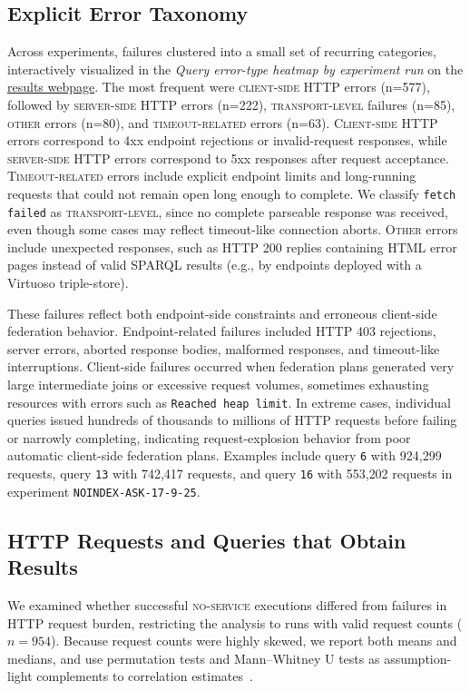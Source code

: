 \documentclass[runningheads]{llncs}
\begin{document}
\subsection{Explicit Error Taxonomy}\label{sec5.2}
Across experiments, failures clustered into a small set of recurring categories, interactively visualized in the \textit{Query error-type heatmap by experiment run} on the \href{https://ecrum19.github.io/fed-survey-results/?mode=query&query=001&queryVariant=original}{results webpage}. 
The most frequent were \textsc{client-side HTTP} errors (n=577), followed by \textsc{server-side HTTP} errors (n=222), \textsc{transport-level} failures (n=85), \textsc{other} errors (n=80), and \textsc{timeout-related} errors (n=63). 
\textsc{Client-side HTTP} errors correspond to 4xx endpoint rejections or invalid-request responses, while \textsc{server-side HTTP} errors correspond to 5xx responses after request acceptance. 
\textsc{Timeout-related} errors include explicit endpoint limits and long-running requests that could not remain open long enough to complete. 
We classify \texttt{fetch failed} as \textsc{transport-level}, since no complete parseable response was received, even though some cases may reflect timeout-like connection aborts. 
\textsc{Other} errors include unexpected responses, such as HTTP 200 replies containing HTML error pages instead of valid SPARQL results (e.g., by endpoints deployed with a Virtuoso triple-store).

These failures reflect both endpoint-side constraints and erroneous client-side federation behavior. 
Endpoint-related failures included HTTP 403 rejections, server errors, aborted response bodies, malformed responses, and timeout-like interruptions. 
Client-side failures occurred when federation plans generated very large intermediate joins or excessive request volumes, sometimes exhausting resources with errors such as \texttt{Reached heap limit}. 
In extreme cases, individual queries issued hundreds of thousands to millions of HTTP requests before failing or narrowly completing, indicating request-explosion behavior from poor automatic client-side federation plans. 
Examples include query \texttt{6} with 924{,}299 requests, query \texttt{13} with 742{,}417 requests, and query \texttt{16} with 553{,}202 requests in experiment \texttt{NOINDEX-ASK-17-9-25}.


\subsection{HTTP Requests and Queries that Obtain Results}\label{sec5.3}
We examined whether successful \textsc{no-service} executions differed from failures in HTTP request burden, restricting the analysis to runs with valid request counts ($n=954$). 
Because request counts were highly skewed, we report both means and medians, and use permutation tests and Mann--Whitney U tests as assumption-light complements to correlation estimates~\cite{altman1994quartiles,good2005permutation,mann1947test}.
\end{document}
